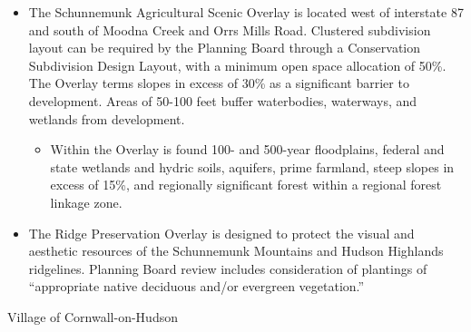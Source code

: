 \begin{itemize}
    \item The Schunnemunk Agricultural Scenic Overlay is located west of interstate 87 and south of Moodna Creek and Orrs Mills Road. Clustered subdivision layout can be required by the Planning Board through a Conservation Subdivision Design Layout, with a minimum open space allocation of 50\%.  The Overlay terms slopes in excess of 30\% as a significant barrier to development.  Areas of 50-100 feet buffer waterbodies, waterways, and wetlands from development.
    \begin{itemize}
        \item Within the Overlay is found 100- and 500-year floodplains, federal and state wetlands and hydric soils, aquifers, prime farmland, steep slopes in excess of 15\%, and regionally significant forest within a regional forest linkage zone.
        \end{itemize}
    \item The Ridge Preservation Overlay is designed to protect the visual and aesthetic resources of the Schunnemunk Mountains and Hudson Highlands ridgelines. Planning Board review includes consideration of plantings of “appropriate native deciduous and/or evergreen vegetation.”
\end{itemize}
Village of Cornwall-on-Hudson
